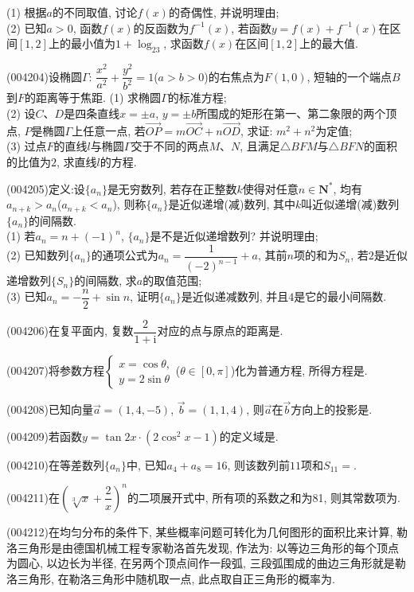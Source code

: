 (1) 根据$a$的不同取值, 讨论$f(x)$的奇偶性, 并说明理由;\\
(2) 已知$a>0$, 函数$f(x)$的反函数为$f^{-1}(x)$, 若函数$y=f(x)+f^{-1}(x)$在区间$[1,2]$上的最小值为$1+\log_23$, 求函数$f(x)$在区间$[1,2]$上的最大值.
\item (004204)设椭圆$\Gamma$: $\dfrac{x^2}{a^2}+\dfrac{y^2}{b^2}=1$($a>b>0$)的右焦点为$F(1,0)$, 短轴的一个端点$B$到$F$的距离等于焦距.
(1) 求椭圆$\Gamma$的标准方程;\\
(2) 设$C$、$D$是四条直线$x=\pm a$, $y=\pm b$所围成的矩形在第一、第二象限的两个顶点, $P$是椭圆$\Gamma$上任意一点, 若$\overrightarrow{OP}=m\overrightarrow{OC}+n\overrightarrow{OD}$, 求证: $m^2+n^2$为定值;\\
(3) 过点$F$的直线$l$与椭圆$\Gamma$交于不同的两点$M$、$N$, 且满足$\triangle BFM$与$\triangle BFN$的面积的比值为$2$, 求直线$l$的方程.
\item (004205)定义:设$\{a_n\}$是无穷数列, 若存在正整数$k$使得对任意$n\in \mathbf{N}^*$, 均有$a_{n+k}>a_n$($a_{n+k}<a_n$), 则称$\{a_n\}$是近似递增(减)数列, 其中$k$叫近似递增(减)数列$\{a_n\}$的间隔数.\\
(1) 若$a_n=n+(-1)^n$, $\{a_n\}$是不是近似递增数列? 并说明理由;\\
(2) 已知数列$\{a_n\}$的通项公式为$a_n=\dfrac 1{(-2)^{n-1}}+a$, 其前$n$项的和为$S_n$, 若$2$是近似递增数列$\{S_n\}$的间隔数, 求$a$的取值范围;\\
(3) 已知$a_n=-\dfrac n2+\sin n$, 证明$\{a_n\}$是近似递减数列, 并且$4$是它的最小间隔数.
\item (004206)在复平面内, 复数$\dfrac 2{1+\mathrm{i}}$对应的点与原点的距离是.
\item (004207)将参数方程$\begin{cases} x=\cos \theta,  \\ y=2\sin \theta  \end{cases}$($\theta \in [0,\pi ]$)化为普通方程, 所得方程是.
\item (004208)已知向量$\overrightarrow a=(1,4,-5)$, $\overrightarrow b=(1,1,4)$, 则$\overrightarrow a$在$\overrightarrow b$方向上的投影是.
\item (004209)若函数$y=\tan 2x\cdot(2\cos^2x-1)$的定义域是.
\item (004210)在等差数列$\{a_n\}$中, 已知$a_4+a_8=16$, 则该数列前$11$项和$S_{11}=$.
\item (004211)在$(\sqrt[3]x+\dfrac 2x)^n$的二项展开式中, 所有项的系数之和为81, 则其常数项为.
\item (004212)在均匀分布的条件下, 某些概率问题可转化为几何图形的面积比来计算, 勒洛三角形是由德国机械工程专家勒洛首先发现, 作法为: 以等边三角形的每个顶点为圆心, 以边长为半径, 在另两个顶点间作一段弧, 三段弧围成的曲边三角形就是勒洛三角形, 在勒洛三角形中随机取一点, 此点取自正三角形的概率为.
